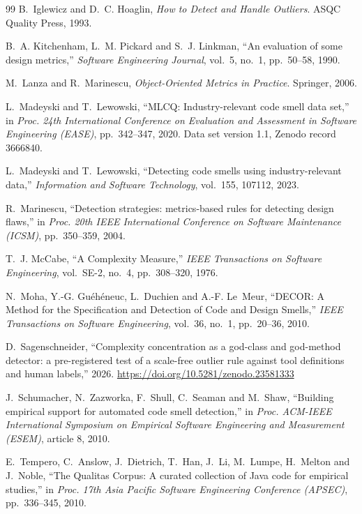 \documentclass[11pt,a4paper]{article}
\begin{document}
\begin{thebibliography}{99}
 B.~Iglewicz and D.~C. Hoaglin,
  \emph{How to Detect and Handle Outliers}. ASQC Quality Press, 1993.

 B.~A. Kitchenham, L.~M. Pickard and S.~J. Linkman,
  ``An evaluation of some design metrics,''
  \emph{Software Engineering Journal}, vol.~5, no.~1, pp.~50--58, 1990.

 M.~Lanza and R.~Marinescu,
  \emph{Object-Oriented Metrics in Practice}. Springer, 2006.

 L.~Madeyski and T.~Lewowski,
  ``MLCQ: Industry-relevant code smell data set,''
  in \emph{Proc. 24th International Conference on Evaluation and Assessment in
  Software Engineering (EASE)}, pp.~342--347, 2020. Data set version 1.1,
  Zenodo record 3666840.

 L.~Madeyski and T.~Lewowski,
  ``Detecting code smells using industry-relevant data,''
  \emph{Information and Software Technology}, vol.~155, 107112, 2023.

 R.~Marinescu,
  ``Detection strategies: metrics-based rules for detecting design flaws,''
  in \emph{Proc. 20th IEEE International Conference on Software Maintenance
  (ICSM)}, pp.~350--359, 2004.

 T.~J. McCabe,
  ``A Complexity Measure,''
  \emph{IEEE Transactions on Software Engineering}, vol.~SE-2, no.~4,
  pp.~308--320, 1976.

 N.~Moha, Y.-G. Gu\'eh\'eneuc, L.~Duchien and A.-F. Le~Meur,
  ``DECOR: A Method for the Specification and Detection of Code and Design
  Smells,''
  \emph{IEEE Transactions on Software Engineering}, vol.~36, no.~1, pp.~20--36,
  2010.

 D.~Sagenschneider,
  ``Complexity concentration as a god-class and god-method detector: a
  pre-registered test of a scale-free outlier rule against tool definitions
  and human labels,'' 2026. \url{https://doi.org/10.5281/zenodo.23581333}

 J.~Schumacher, N.~Zazworka, F.~Shull, C.~Seaman and
  M.~Shaw,
  ``Building empirical support for automated code smell detection,''
  in \emph{Proc. ACM-IEEE International Symposium on Empirical Software
  Engineering and Measurement (ESEM)}, article 8, 2010.

 E.~Tempero, C.~Anslow, J.~Dietrich, T.~Han, J.~Li,
  M.~Lumpe, H.~Melton and J.~Noble,
  ``The Qualitas Corpus: A curated collection of Java code for empirical
  studies,''
  in \emph{Proc. 17th Asia Pacific Software Engineering Conference (APSEC)},
  pp.~336--345, 2010.


\end{thebibliography}
\end{document}
